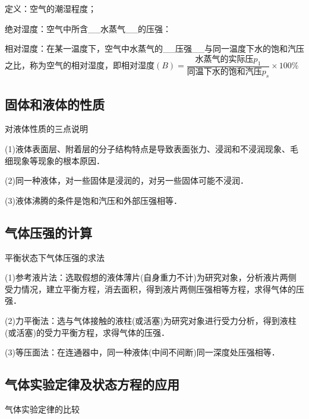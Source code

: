 定义：空气的潮湿程度；

绝对湿度：空气中所含\_\_水蒸气\_\_的压强：

相对湿度：在某一温度下，空气中水蒸气的\_\_压强\_\_与同一温度下水的饱和汽压之比，称为空气的相对湿度，即相对湿度$(B)=\dfrac{\text{水蒸气的实际压}p_1}{\text{同温下水的饱和汽压}p_s}\times 100\%$

\newpage
\subsection{固体和液体的性质}

对液体性质的三点说明

(1)液体表面层、附着层的分子结构特点是导致表面张力、浸润和不浸润现象、毛细现象等现象的根本原因．

(2)同一种液体，对一些固体是浸润的，对另一些固体可能不浸润．

(3)液体沸腾的条件是饱和汽压和外部压强相等．


\subsection{气体压强的计算}

平衡状态下气体压强的求法

(1)参考液片法：选取假想的液体薄片(自身重力不计)为研究对象，分析液片两侧受力情况，建立平衡方程，消去面积，得到液片两侧压强相等方程，求得气体的压强．

(2)力平衡法：选与气体接触的液柱(或活塞)为研究对象进行受力分析，得到液柱(或活塞)的受力平衡方程，求得气体的压强．

(3)等压面法：在连通器中，同一种液体(中间不间断)同一深度处压强相等．


\subsection{气体实验定律及状态方程的应用}

气体实验定律的比较

